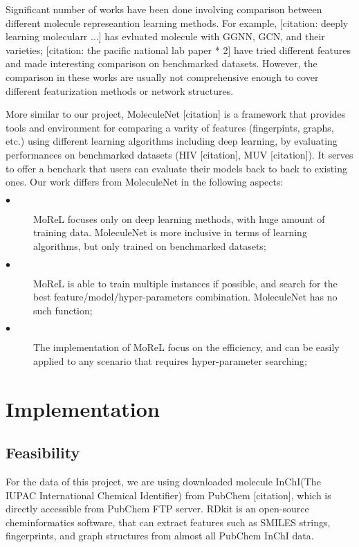 \documentclass[10pt,twocolumn]{article}
\begin{document}
Significant number of works have been done involving comparison between different molecule represeantion learning methods. 
For example, [citation: deeply learning molecularr ...] has evluated molecule with GGNN, GCN, and their varieties; [citation: the pacific national lab paper * 2] have tried different features and made interesting comparison on benchmarked datasets. 
However, the comparison in these works are usually not comprehensive enough to cover different featurization methods or network structures. 

More similar to our project, MoleculeNet [citation] is a framework that provides tools and environment for comparing a varity of features (fingerpints, graphs, etc.) using different learning algorithms including deep learning, by evaluating performances on benchmarked datasets (HIV [citation], MUV [citation]). 
It serves to offer a benchark that users can evaluate their models back to back to existing ones. 
Our work differs from MoleculeNet in the following aspects:
\begin{description}
	\item[$\bullet$]  MoReL focuses only on deep learning methods, with huge amount of training data. MoleculeNet is more inclusive in terms of learning algorithms, but only trained on benchmarked datasets;
	\item[$\bullet$]  MoReL is able to train multiple instances if possible, and search for the best feature/model/hyper-parameters combination. MoleculeNet has no such function;
	\item[$\bullet$]  The implementation of MoReL focus on the efficiency, and can be easily applied to any scenario that requires hyper-parameter searching; 
\end{description}


\section{Implementation} \label{body}

\subsection{Feasibility}

For the data of this project, we are using downloaded molecule InChI(The IUPAC International Chemical Identifier) from PubChem [citation], which is directly accessible from PubChem FTP server. 
RDkit is an open-source cheminformatics software, that can extract features such as SMILES strings, fingerprints, and graph structures from almost all PubChem InChI data.
\end{document}
